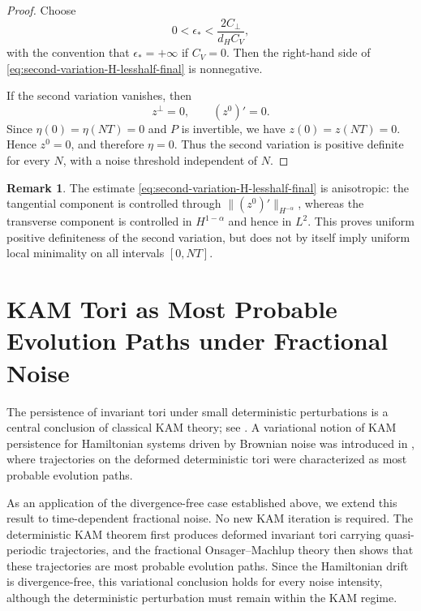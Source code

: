 \documentclass[preprint,12pt]{elsarticle}
\theoremstyle{definition}
\newtheorem{remark}{Remark}[section]
\theoremstyle{plain}
\begin{document}
\begin{proof}
Choose
\begin{equation*}
    0<\epsilon_*
    <
    \frac{2C_\perp}{d_HC_V},
\end{equation*}
with the convention that $\epsilon_*=+\infty$ if $C_V=0$. Then the
right-hand side of
\eqref{eq:second-variation-H-lesshalf-final} is nonnegative.

If the second variation vanishes, then
\begin{equation*}
    z^\perp=0,
    \qquad
    (z^0)'=0.
\end{equation*}
Since $\eta(0)=\eta(NT)=0$ and $P$ is invertible, we have
$z(0)=z(NT)=0$. Hence $z^0=0$, and therefore $\eta=0$. Thus the second
variation is positive definite for every $N$, with a noise threshold
independent of $N$.
\end{proof}

\begin{remark}
The estimate \eqref{eq:second-variation-H-lesshalf-final} is anisotropic:
the tangential component is controlled through
$\|(z^0)'\|_{H^{-\alpha}}$, whereas the transverse component is controlled
in $H^{1-\alpha}$ and hence in $L^2$. This proves uniform positive
definiteness of the second variation, but does not by itself imply uniform
local minimality on all intervals $[0,NT]$.
\end{remark}



    \section{KAM Tori as Most Probable Evolution Paths under Fractional Noise}

The persistence of invariant tori under small deterministic
perturbations is a central conclusion of classical KAM theory; see
\cite{Kolmogorov1954,Arnold1963,Moser1962}. A variational notion of
KAM persistence for Hamiltonian systems driven by Brownian noise was
introduced in \cite{xinze2026most}, where trajectories on the
deformed deterministic tori were characterized as most probable
evolution paths.

As an application of the divergence-free case established above, we
extend this result to time-dependent fractional noise. No new KAM
iteration is required. The deterministic KAM theorem first produces
deformed invariant tori carrying quasi-periodic trajectories, and the
fractional Onsager--Machlup theory then shows that these trajectories
are most probable evolution paths. Since the Hamiltonian drift is
divergence-free, this variational conclusion holds for every noise
intensity, although the deterministic perturbation must remain within
the KAM regime.
\end{document}
